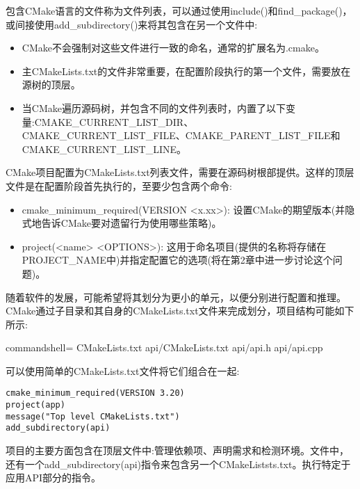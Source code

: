
包含CMake语言的文件称为文件列表，可以通过使用include()和find\_package()，或间接使用add\_subdirectory()来将其包含在另一个文件中:

\begin{itemize}
\item 
CMake不会强制对这些文件进行一致的命名，通常的扩展名为.cmake。

\item 
主CMakeLists.txt的文件非常重要，在配置阶段执行的第一个文件，需要放在源树的顶层。

\item 
当CMake遍历源码树，并包含不同的文件列表时，内置了以下变量:CMAKE\_CURRENT\_LIST\_DIR、CMAKE\_CURRENT\_LIST\_FILE、CMAKE\_PARENT\_LIST\_FILE和CMAKE\_CURRENT\_LIST\_LINE。
\end{itemize}


CMake项目配置为CMakeLists.txt列表文件，需要在源码树根部提供。这样的顶层文件是在配置阶段首先执行的，至要少包含两个命令:

\begin{itemize}
\item 
cmake\_minimum\_required(VERSION <x.xx>): 设置CMake的期望版本(并隐式地告诉CMake要对遗留行为使用哪些策略)。

\item 
project(<name> <OPTIONS>): 这用于命名项目(提供的名称将存储在PROJECT\_NAME中)并指定配置它的选项(将在第2章中进一步讨论这个问题)。
\end{itemize}

随着软件的发展，可能希望将其划分为更小的单元，以便分别进行配置和推理。CMake通过子目录和其自身的CMakeLists.txt文件来完成划分，项目结构可能如下所示:

\begin{tcblisting}{commandshell={}}
CMakeLists.txt
api/CMakeLists.txt
api/api.h
api/api.cpp
\end{tcblisting}

可以使用简单的CMakeLists.txt文件将它们组合在一起:

\begin{lstlisting}[style=styleCMake]
cmake_minimum_required(VERSION 3.20)
project(app)
message("Top level CMakeLists.txt")
add_subdirectory(api)
\end{lstlisting}

项目的主要方面包含在顶层文件中:管理依赖项、声明需求和检测环境。文件中，还有一个add\_subdirectory(api)指令来包含另一个CMakeListsts.txt。执行特定于应用API部分的指令。

